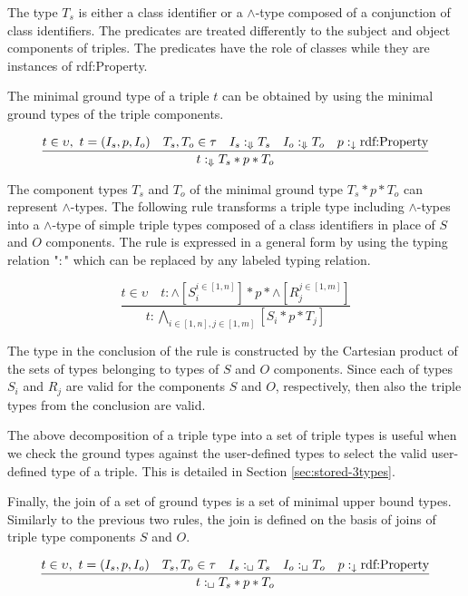 \documentclass[runningheads]{llncs}
\newcommand{\darr}{\downarrow}
\newcommand{\Darr}{\Downarrow}
\begin{document}
The type $T_s$ is either a class identifier or a $\land$-type composed
of a conjunction of class identifiers. The predicates are treated
differently to the subject and object components of triples. The
predicates have the role of classes while they are instances of
rdf:Property.

The minimal ground type of a triple $t$ can be obtained by using the
minimal ground types of the triple components. 

\begin{equation}
\label{rul:3-min-ground}
\dfrac{t\in\upsilon,\ t=(I_s,p,I_o)\quad T_s,T_o\in\tau\quad I_s:_\Darr\/T_s\quad I_o:_\Darr\/T_o\quad p:_\darr\text{rdf:Property}}
      {t:_\Darr\/T_s*p*T_o}
\end{equation}

The component types $T_s$ and $T_o$ of the minimal ground type
$T_s*p*T_o$ can represent $\land$-types. The following rule transforms
a triple type including $\land$-types into a $\land$-type of simple
triple types composed of a class identifiers in place of $S$ and $O$
components. The rule is expressed in a general form by using the
typing relation "$:$" which can be replaced by any labeled typing
relation.

\begin{equation}
\label{rul:3-land-transform}
\dfrac{t\in\upsilon\quad t:\land[S_i^{i\in[1,n]}]*p*\land[R_j^{j\in[1,m]}]}
      {t:\bigwedge_{i\in[1,n], j\in[1,m]}[S_i*p*T_j]}
\end{equation}

The type in the conclusion of the rule is constructed by the Cartesian
product of the sets of types belonging to types of $S$ and $O$
components. Since each of types $S_i$ and $R_j$ are valid for the
components $S$ and $O$, respectively, then also the triple types from
the conclusion are valid.

The above decomposition of a triple type into a set of triple types is
useful when we check the ground types against the user-defined types
to select the valid user-defined type of a triple. This is detailed in
Section \ref{sec:stored-3types}.

Finally, the join of a set of ground types is a set of minimal upper
bound types. Similarly to the previous two rules, the join is defined
on the basis of joins of triple type components $S$ and $O$.

\begin{equation}
\label{rul:3-join}
\dfrac{t\in\upsilon,\ t=(I_s,p,I_o)\quad T_s,T_o\in\tau\quad I_s:_\sqcup\/T_s\quad I_o:_\sqcup\/T_o\quad p:_\darr\text{rdf:Property}}
      {t:_\sqcup\/T_s*p*T_o}
\end{equation}
\end{document}
